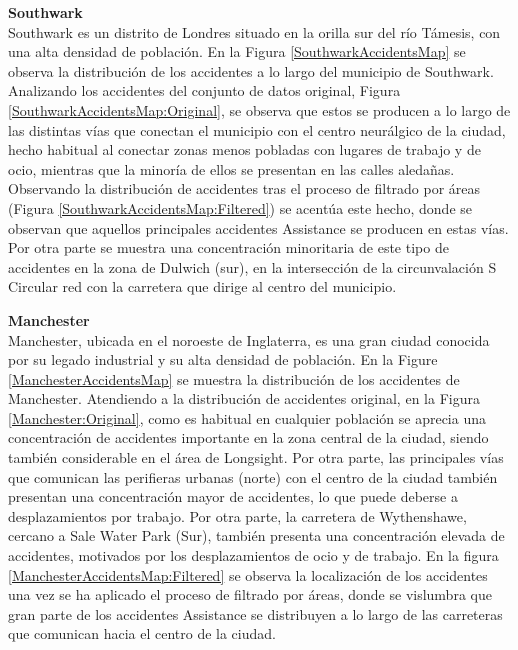 \documentclass{uathesis-es}
\begin{document}
{\textbf{Southwark}\\

Southwark es un distrito de Londres situado en la orilla sur del río Támesis, con una alta densidad de población. En la Figura \ref{SouthwarkAccidentsMap} se observa la distribución de los accidentes a lo largo del municipio de Southwark. Analizando los accidentes del conjunto de datos original, Figura \ref{SouthwarkAccidentsMap:Original}, se observa que estos se producen a lo largo de las distintas vías que conectan el municipio con el centro neurálgico de la ciudad, hecho habitual al conectar zonas menos pobladas con lugares de trabajo y de ocio, mientras que la minoría de ellos se presentan en las calles aledañas. Observando la distribución de accidentes tras el proceso de filtrado por áreas (Figura \ref{SouthwarkAccidentsMap:Filtered}) se acentúa este hecho, donde se observan que aquellos principales accidentes Assistance se producen en estas vías. Por otra parte se muestra una concentración minoritaria de este tipo de accidentes en la zona de Dulwich (sur), en la intersección de la circunvalación S Circular red con la carretera que dirige al centro del municipio.




\textbf{Manchester}\\

Manchester, ubicada en el noroeste de Inglaterra, es una gran ciudad conocida por su legado industrial y su alta densidad de población. En la Figure \ref{ManchesterAccidentsMap} se muestra la distribución de los accidentes de Manchester. Atendiendo a la distribución de accidentes original, en la Figura \ref{Manchester:Original}, como es habitual en cualquier población se aprecia una concentración de accidentes importante en la zona central de la ciudad, siendo también considerable en el área de Longsight. Por otra parte, las principales vías que comunican las perifieras urbanas (norte) con el centro de la ciudad también presentan una concentración mayor de accidentes, lo que puede deberse a desplazamientos por trabajo. Por otra parte, la carretera de Wythenshawe, cercano a Sale Water Park (Sur), también presenta una concentración elevada de accidentes, motivados por los desplazamientos de ocio y de trabajo. En la figura \ref{ManchesterAccidentsMap:Filtered} se observa la localización de los accidentes una vez se ha aplicado el proceso de filtrado por áreas, donde se vislumbra que gran parte de los accidentes Assistance se distribuyen a lo largo de las carreteras que comunican hacia el centro de la ciudad.

}
\end{document}

